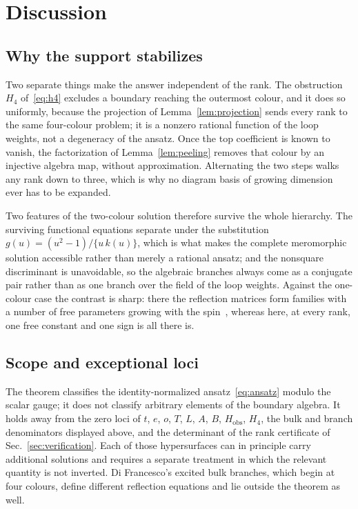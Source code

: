 \documentclass[
  aps,pre,
  reprint,
  superscriptaddress,
  amsmath,amssymb,
  floatfix
]{revtex4-2}
\theoremstyle{plain}
\theoremstyle{definition}
\theoremstyle{remark}
\begin{document}
\section{Discussion}
\label{sec:discussion}

\subsection{Why the support stabilizes}

Two separate things make the answer independent of the rank. The obstruction
$H_4$ of~\eqref{eq:h4} excludes a boundary reaching the outermost colour, and
it does so uniformly, because the projection of Lemma~\ref{lem:projection}
sends every rank to the same four-colour problem; it is a nonzero rational
function of the loop weights, not a degeneracy of the ansatz. Once the top
coefficient is known to vanish, the factorization of Lemma~\ref{lem:peeling}
removes that colour by an injective algebra map, without approximation.
Alternating the two steps walks any rank down to three, which is why no diagram
basis of growing dimension ever has to be expanded.

Two features of the two-colour solution therefore survive the whole hierarchy.
The surviving functional equations separate under the substitution
$g(u)=(u^2-1)/\{u\,k(u)\}$, which is what makes the complete meromorphic
solution accessible rather than merely a rational ansatz; and the nonsquare
discriminant is unavoidable, so the algebraic branches always come as a
conjugate pair rather than as one branch over the field of the loop weights.
Against the one-colour case the contrast is sharp: there the reflection
matrices form families with a number of free parameters growing with the
spin~\cite{limasantos2011mathcal}, whereas here, at every rank, one free
constant and one sign is all there is.

\subsection{Scope and exceptional loci}

The theorem classifies the identity-normalized ansatz~\eqref{eq:ansatz} modulo
the scalar gauge; it does not classify arbitrary elements of the boundary
algebra. It holds away from the zero loci of $t$, $e$, $o$, $T$, $L$, $A$, $B$,
$H_{\mathrm{obs}}$, $H_4$, the bulk and branch denominators displayed above,
and the determinant of the rank certificate of Sec.~\ref{sec:verification}.
Each of those hypersurfaces can in principle carry additional solutions and
requires a separate treatment in which the relevant quantity is not inverted.
Di Francesco's excited bulk branches, which begin at four colours, define
different reflection equations and lie outside the theorem as well.
\end{document}
